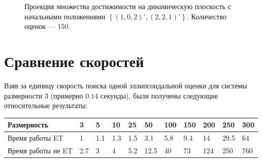 \documentclass[10pt, a4paper]{article}
\begin{document}
\begin{figure}[H]
\caption{Проекция множества достижимости на динамическую плоскость с начальными положениями $\left\{(1,0,2)',(2,2,1)'\right\}$. Количество оценок --- 150.}
\end{figure}
\section{Сравнение скоростей}
Взяв за единицу скорость поиска одной эллипсоидальной оценки для системы размерности 3 (примерно $0.14$ секунды), были получены следующие относительные результаты:
\begin{tabular}{|l|l|l|l|l|l|l|l|l|l|l|}
\hline
Размерность & 3 & 5 & 10 & 25 & 50 & 100 & 150 & 200 & 250 & 300 \\
\hline
Время работы ET & 1 & 1.1 & 1.3 & 1.5 & 3.1 &  5.8 & 9.4 & 14 & 29.5 & 64 \\
\hline
Время работы не ET & 2.7 & 3 & 4 & 5.2 & 12.5 & 40 & 73 & 124 & 250 & 760 \\
\hline
\end{tabular}
\end{document}
